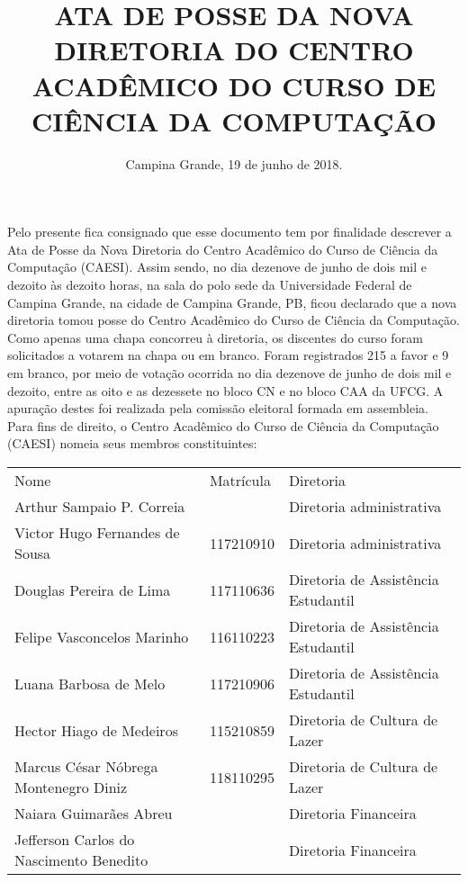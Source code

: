 \documentclass[11pt,letterpaper]{article}
\begin{document}
\title{ ATA DE POSSE DA NOVA DIRETORIA DO CENTRO ACADÊMICO DO CURSO DE CIÊNCIA DA COMPUTAÇÃO }
\date{Campina Grande, 19 de junho de 2018.}
\maketitle

Pelo presente fica consignado que esse documento tem por finalidade descrever a Ata de Posse da Nova Diretoria do Centro Acadêmico do Curso de Ciência da Computação (CAESI). Assim sendo, no dia dezenove de junho de dois mil e dezoito às dezoito horas, na sala do polo sede da Universidade Federal de Campina Grande, na cidade de Campina Grande, PB, ficou declarado que a nova diretoria tomou posse do Centro Acadêmico do Curso de Ciência da Computação. \\

Como apenas uma chapa concorreu à diretoria, os discentes do curso foram solicitados a votarem na chapa ou em branco. Foram registrados 215 a favor e 9 em branco, por meio de votação ocorrida no dia dezenove de junho de dois mil e dezoito, entre as oito e as dezessete no bloco CN e no bloco CAA da UFCG. A apuração destes foi realizada pela comissão eleitoral formada em assembleia. \\

Para fins de direito, o Centro Acadêmico do Curso de Ciência da Computação (CAESI) nomeia seus membros constituintes:\\

\begin{center}
\begin{tabular}{|l|l|l|}
\hline
Nome & Matrícula & Diretoria \\
Arthur Sampaio P. Correia & & Diretoria administrativa \\
Victor Hugo Fernandes de Sousa & 117210910 & Diretoria administrativa \\
Douglas Pereira de Lima & 117110636 & Diretoria de Assistência Estudantil \\
Felipe Vasconcelos Marinho & 116110223 & Diretoria de Assistência Estudantil \\
Luana Barbosa de Melo & 117210906 & Diretoria de Assistência Estudantil \\
Hector Hiago de Medeiros & 115210859 & Diretoria de Cultura de Lazer \\
Marcus César Nóbrega Montenegro Diniz & 118110295 & Diretoria de Cultura de Lazer \\
Naiara Guimarães Abreu & &  Diretoria Financeira \\
Jefferson Carlos do Nascimento Benedito & & Diretoria Financeira \\
\hline
\end{tabular}\\
\end{center}
\end{document}
